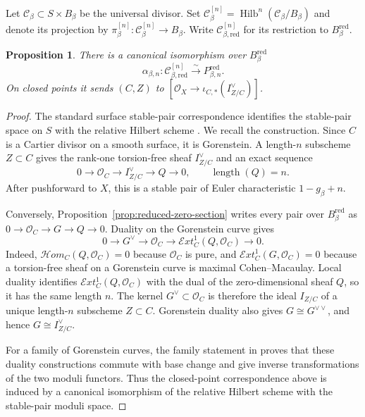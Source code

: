 \documentclass[11pt,reqno]{amsart}
\newtheorem{proposition}[theorem]{Proposition}
\theoremstyle{definition}
\newcommand{\Ocal}{\mathcal O}
\newcommand{\Hilb}{\operatorname{Hilb}}
\newcommand{\red}{\mathrm{red}}
\begin{document}
Let $\mathcal C_\beta\subset S\times B_\beta$ be the universal divisor.  Set
$\mathcal C_\beta^{[n]}=\Hilb^n(\mathcal C_\beta/B_\beta)$ and denote its
projection by $\pi_\beta^{[n]}:\mathcal C_\beta^{[n]}\to B_\beta$.  Write
$\mathcal C_{\beta,\red}^{[n]}$ for its restriction to
$B_\beta^{\red}$.

\begin{proposition}\label{prop:hilbert-pt}
There is a canonical isomorphism over $B_\beta^{\red}$
\[
  \alpha_{\beta,n}:\mathcal C_{\beta,\red}^{[n]}
  \xrightarrow{\sim}P_{\beta,n}^{\red}.
\]
On closed points it sends $(C,Z)$ to
$[\Ocal_X\to\iota_{C,*}(I_{Z/C}^{\vee})]$.
\end{proposition}

\begin{proof}
The standard surface stable-pair correspondence identifies the stable-pair
space on $S$ with the relative Hilbert scheme
\cite[Proposition~1]{CKK}.  We recall the construction.
Since $C$ is a Cartier divisor on a smooth surface, it is Gorenstein.  A
length-$n$ subscheme $Z\subset C$ gives the rank-one torsion-free sheaf
$I_{Z/C}^{\vee}$ and an exact sequence
\[
  0\longrightarrow\Ocal_C\longrightarrow I_{Z/C}^{\vee}
  \longrightarrow Q\longrightarrow0,
  \qquad \operatorname{length}(Q)=n.
\]
After pushforward to $X$, this is a stable pair of Euler characteristic
$1-g_\beta+n$.

Conversely, Proposition~\ref{prop:reduced-zero-section} writes every pair
over $B_\beta^{\red}$ as
$0\to\Ocal_C\to G\to Q\to0$.  Duality on the Gorenstein curve gives
\[
  0\longrightarrow G^\vee\longrightarrow\Ocal_C
  \longrightarrow\mathcal Ext_C^1(Q,\Ocal_C)\longrightarrow0.
\]
Indeed, $\mathcal{H}\!om_C(Q,\Ocal_C)=0$ because $\Ocal_C$ is pure, and
$\mathcal Ext_C^1(G,\Ocal_C)=0$ because a torsion-free sheaf on a Gorenstein
curve is maximal Cohen--Macaulay.  Local duality identifies
$\mathcal Ext_C^1(Q,\Ocal_C)$ with the dual of the zero-dimensional sheaf
$Q$, so it has the same length $n$.  The kernel $G^\vee\subset\Ocal_C$ is
therefore the ideal $I_{Z/C}$ of a unique length-$n$ subscheme $Z\subset C$.
Gorenstein duality also gives $G\cong G^{\vee\vee}$, and hence
$G\cong I_{Z/C}^\vee$.

For a family of Gorenstein curves, the family statement in
\cite[Proposition~1]{CKK} proves that these duality constructions commute with
base change and give inverse transformations of the two moduli functors.
Thus the closed-point correspondence above is induced by a canonical
isomorphism of the relative Hilbert scheme with the stable-pair moduli space.
\end{proof}
\end{document}
